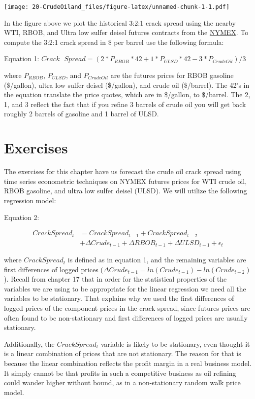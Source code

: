 \documentclass[
]{book}
\begin{document}
\texttt{[image: 20-CrudeOiland\_files/figure-latex/unnamed-chunk-1-1.pdf]}

In the figure above we plot the historical 3:2:1 crack spread using the nearby WTI, RBOB, and Ultra low sulfer deisel futures contracts from the \href{www.NYMEX.com}{NYMEX}. To compute the 3:2:1 crack spread in \$ per barrel use the following formula:

Equation 1: \(Crack \text{ } Spread = (2*P_{RBOB}*42 + 1*P_{ULSD}*42 - 3*P_{CrudeOil})/3\)

where \(P_{RBOB}\), \(P_{ULSD}\), and \(P_{CrudeOil}\) are the futures prices for RBOB gasoline (\$/gallon), ultra low sulfer deisel (\$/gallon), and crude oil (\$/barrel). The 42's in the equation translate the price quotes, which are in \$/gallon, to \$/barrel. The 2, 1, and 3 reflect the fact that if you refine 3 barrels of crude oil you will get back roughly 2 barrels of gasoline and 1 barrel of ULSD.

\hypertarget{exercises-9}{%
\section{Exercises}\label{exercises-9}}

The exercises for this chapter have us forecast the crude oil crack spread using time series econometric techniques on NYMEX futures prices for WTI crude oil, RBOB gasoline, and ultra low sulfer deisel (ULSD). We will utilize the following regression model:

Equation 2:

\begin{align}
Crack Spread_t &= Crack Spread_{t-1} + Crack Spread_{t-2}    \\
                  & + \Delta Crude_{t-1} + \Delta RBOB_{t-1} + \Delta ULSD_{t-1} + \epsilon_t
\end{align}

where \(Crack Spread_t\) is defined as in equation 1, and the remaining variables are first differences of logged prices (\(\Delta Crude_{t-1} = ln(Crude_{t-1}) - ln(Crude_{t-2})\)). Recall from chapter 17 that in order for the statistical properties of the variables we are using to be appropriate for the linear regression we need all the variables to be stationary. That explains why we used the first differences of logged prices of the component prices in the crack spread, since futures prices are often found to be non-stationary and first differences of logged prices are usually stationary.

Additionally, the \(Crack Spread_t\) variable is likely to be stationary, even thought it is a linear combination of prices that are not stationary. The reason for that is because the linear combination reflects the profit margin in a real business model. It simply cannot be that profits in such a competitive business as oil refining could wander higher without bound, as in a non-stationary random walk price model.
\end{document}

